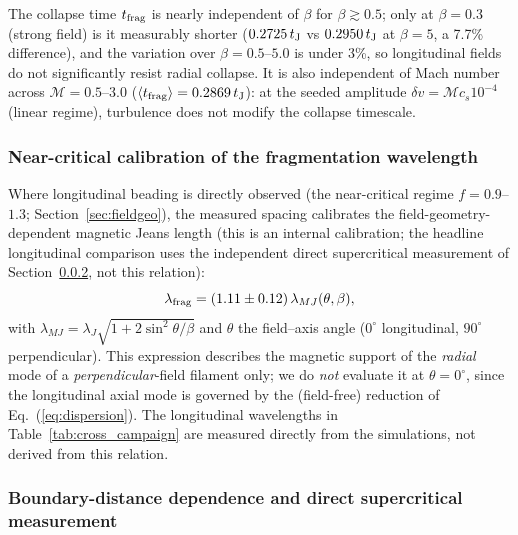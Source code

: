 \documentclass[usenatbib,twoside,twocolumn]{mnras}
\begin{document}
The collapse time $t_{\rm frag}$ is nearly independent of $\beta$ for $\beta \gtrsim 0.5$; only at $\beta = 0.3$ (strong field) is it measurably shorter ($0.2725\,t_{\rm J}$ vs $0.2950\,t_{\rm J}$ at $\beta = 5$, a 7.7\% difference), and the variation over $\beta = 0.5$--$5.0$ is under 3\%, so longitudinal fields do not significantly resist radial collapse. It is also independent of Mach number across $\mathcal{M}=0.5$--$3.0$ ($\langle t_{\rm frag}\rangle=0.2869\,t_{\rm J}$): at the seeded amplitude $\delta v=\mathcal{M}c_s10^{-4}$ (linear regime), turbulence does not modify the collapse timescale.




\subsubsection{Near-critical calibration of the fragmentation wavelength}

Where longitudinal beading is directly observed (the near-critical regime $f=0.9$--$1.3$; Section~\ref{sec:fieldgeo}), the measured spacing calibrates the field-geometry-dependent magnetic Jeans length (this is an internal calibration; the headline longitudinal comparison uses the independent direct supercritical measurement of Section~\ref{sec:modecompetition}, not this relation):
\begin{equation}
\lambda_{\rm frag} = (1.11 \pm 0.12)\,\lambda_{MJ}(\theta, \beta),
\label{eq:calib}
\end{equation}
with $\lambda_{MJ}=\lambda_J\sqrt{1+2\sin^2\theta/\beta}$ \citep{Nakamura1993} and $\theta$ the field--axis angle ($0^\circ$ longitudinal, $90^\circ$ perpendicular). This expression describes the magnetic support of the \emph{radial} mode of a \emph{perpendicular}-field filament only; we do \emph{not} evaluate it at $\theta=0^\circ$, since the longitudinal axial mode is governed by the (field-free) reduction of Eq.~(\ref{eq:dispersion}). The longitudinal wavelengths in Table~\ref{tab:cross_campaign} are measured directly from the simulations, not derived from this relation.


\subsubsection{Boundary-distance dependence and direct supercritical measurement}
\label{sec:modecompetition}
\end{document}

